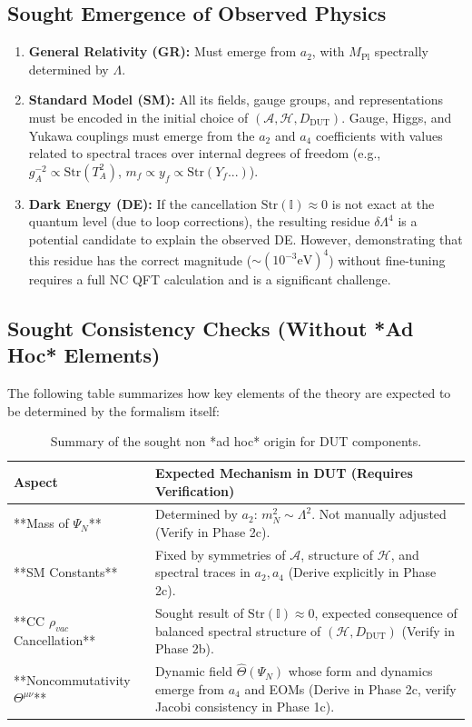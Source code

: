 \documentclass[11pt, a4paper]{article}
\theoremstyle{remark}
\newcommand{\Op}[1]{\hat{#1}}
\begin{document}
\subsection{Sought Emergence of Observed Physics}
\begin{enumerate}
    \item \textbf{General Relativity (GR):} Must emerge from \( a_2 \), with \( M_{\text{Pl}} \) spectrally determined by \( \Lambda \).
    \item \textbf{Standard Model (SM):} All its fields, gauge groups, and representations must be encoded in the initial choice of \( (\mathcal{A}, \mathcal{H}, D_{\text{DUT}}) \). Gauge, Higgs, and Yukawa couplings must emerge from the \( a_2 \) and \( a_4 \) coefficients with values related to spectral traces over internal degrees of freedom (e.g., \( g_A^{-2} \propto \text{Str}(T_A^2) \), \( m_f \propto y_f \propto \text{Str}(Y_f...) \)).
    \item \textbf{Dark Energy (DE):} If the cancellation \( \text{Str}(\mathbb{I}) \approx 0 \) is not exact at the quantum level (due to loop corrections), the resulting residue \( \delta \Lambda^4 \) is a potential candidate to explain the observed DE. However, demonstrating that this residue has the correct magnitude (\( \sim (10^{-3} \text{eV})^4 \)) without fine-tuning requires a full NC QFT calculation and is a significant challenge.
\end{enumerate}

\subsection{Sought Consistency Checks (Without *Ad Hoc* Elements)}
The following table summarizes how key elements of the theory are expected to be determined by the formalism itself:

\begin{table}[h!]
\centering
\footnotesize
\begin{tabularx}{\textwidth}{@{}lX@{}}
\toprule
\textbf{Aspect}             & \textbf{Expected Mechanism in DUT (Requires Verification)} \\
\midrule
**Mass of \( \Psi_N \)** & Determined by \( a_2 \): \( m_N^2 \sim \Lambda^2 \). Not manually adjusted (Verify in Phase 2c). \\ \addlinespace
**SM Constants** & Fixed by symmetries of \( \mathcal{A} \), structure of \( \mathcal{H} \), and spectral traces in \( a_2, a_4 \) (Derive explicitly in Phase 2c). \\ \addlinespace
**CC \(\rho_{vac}\) Cancellation** & Sought result of \( \text{Str}(\mathbb{I}) \approx 0 \), expected consequence of balanced spectral structure of \( (\mathcal{H}, D_{\text{DUT}}) \) (Verify in Phase 2b). \\ \addlinespace
**Noncommutativity \( \Theta^{\mu\nu} \)** & Dynamic field \( \Op{\Theta}(\Psi_N) \) whose form and dynamics emerge from \( a_4 \) and EOMs (Derive in Phase 2c, verify Jacobi consistency in Phase 1c). \\
\bottomrule
\end{tabularx}
\caption{Summary of the sought non *ad hoc* origin for DUT components.}
\label{tab:non_ad_hoc_summary}
\end{table}
\end{document}
